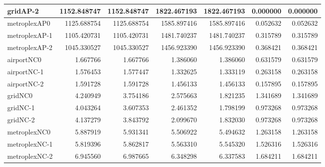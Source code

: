 \begin{longtable}{|l|r|r|r|r|r|r|}
gridAP-2 & 1152.848747 & 1152.848747 & 1822.467193 & 1822.467193 & 0.000000 & 0.000000 \\ \hline
metroplexAP0 & 1125.688754 & 1125.688754 & 1585.897416 & 1585.897416 & 0.052632 & 0.052632 \\ \hline
metroplexAP-1 & 1105.420731 & 1105.420731 & 1481.740237 & 1481.740237 & 0.315789 & 0.315789 \\ \hline
metroplexAP-2 & 1045.330527 & 1045.330527 & 1456.923390 & 1456.923390 & 0.368421 & 0.368421 \\ \hline
airportNC0 & 1.667766 & 1.667766 & 1.386060 & 1.386060 & 0.631579 & 0.631579 \\ \hline
airportNC-1 & 1.576453 & 1.577447 & 1.332625 & 1.333119 & 0.263158 & 0.263158 \\ \hline
airportNC-2 & 1.591728 & 1.591728 & 1.456133 & 1.456133 & 0.157895 & 0.157895 \\ \hline
gridNC0 & 4.240949 & 3.754186 & 2.575663 & 1.821235 & 1.341689 & 1.341689 \\ \hline
gridNC-1 & 4.043264 & 3.607353 & 2.461352 & 1.798199 & 0.973268 & 0.973268 \\ \hline
gridNC-2 & 4.137279 & 3.843792 & 2.099670 & 1.832030 & 0.973268 & 0.973268 \\ \hline
metroplexNC0 & 5.887919 & 5.931341 & 5.506922 & 5.494632 & 1.263158 & 1.263158 \\ \hline
metroplexNC-1 & 5.819396 & 5.862817 & 5.563310 & 5.545320 & 1.526316 & 1.526316 \\ \hline
metroplexNC-2 & 6.945560 & 6.987665 & 6.348298 & 6.337583 & 1.684211 & 1.684211 \\ \hline
\end{longtable}
